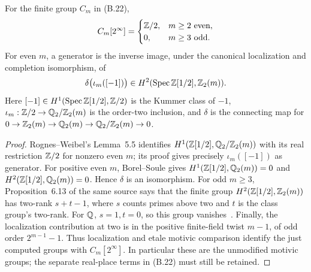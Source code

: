 \begin{proposition}
\label{prop:B-two-primary}
For the finite group \(C_m\) in (B.22),
\[
 C_m[2^\infty]=
 \begin{cases}\mathbb Z/2,&m\ge2\text{ even},\\0,&m\ge3\text{ odd}.
 \end{cases}
\]
For even \(m\), a generator is the inverse image, under the
canonical localization and completion isomorphism, of
\[
 \delta\bigl(\iota_m([-1])\bigr)
 \in H^2(\operatorname{Spec}\mathbb Z[1/2],\mathbb Z_2(m)).
\]
Here \([-1]\in H^1(\operatorname{Spec}\mathbb Z[1/2],\mathbb Z/2)\) is the
Kummer class of \(-1\), \(\iota_m:\mathbb Z/2\to\mathbb Q_2/\mathbb Z_2(m)\)
is the order-two inclusion, and \(\delta\) is the connecting map
for \(0\to\mathbb Z_2(m)\to\mathbb Q_2(m)\to\mathbb Q_2/\mathbb Z_2(m)\to0\).
\end{proposition}
\begin{proof}
Rognes--Weibel's Lemma~5.5 identifies
\(H^1(\mathbb Z[1/2],\mathbb Q_2/\mathbb Z_2(m))\) with its real restriction
\(\mathbb Z/2\) for nonzero even \(m\); its proof gives precisely
\(\iota_m([-1])\) as generator.  For positive even \(m\),
Borel--Soule gives \(H^1(\mathbb Z[1/2],\mathbb Q_2(m))=0\) and
\(H^2(\mathbb Z[1/2],\mathbb Q_2(m))=0\).  Hence \(\delta\) is an
isomorphism.  For odd \(m\ge3\), Proposition~6.13 of the same
source says that the finite group
\(H^2(\mathbb Z[1/2],\mathbb Z_2(m))\) has two-rank \(s+t-1\),
where \(s\) counts primes above two and \(t\) is the
class group's two-rank.  For \(\mathbb Q\), \(s=1,t=0\), so this
group vanishes~\cite[Lemma~5.5, Propositions~6.12--6.13]{BRognesWeibel2000}.
Finally, the localization contribution at two is in the positive
finite-field twist \(m-1\), of odd order \(2^{m-1}-1\).
Thus localization and etale motivic comparison identify the just
computed groups with \(C_m[2^\infty]\).  In particular these
are the unmodified motivic groups; the separate real-place terms in
(B.22) must still be retained.
\end{proof}





